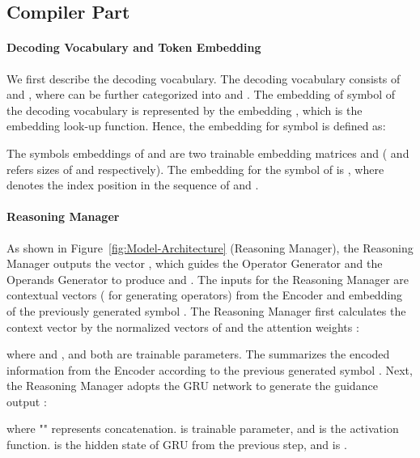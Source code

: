 \documentclass{article}
\begin{document}
\subsection{Compiler Part}

\paragraph{Decoding Vocabulary and Token Embedding}

We first describe the decoding vocabulary. The decoding vocabulary consists of  and , where  can be further categorized into  and . The embedding  of symbol  of the decoding vocabulary is represented by the embedding , which is the embedding look-up function. Hence, the embedding for symbol  is defined as:

\in\in\in

The symbols embeddings of  and  are two trainable embedding matrices  and  ( and  refers sizes of  and   respectively). The embedding for the symbol of  is , where  denotes the index position in the sequence of  and .



\paragraph{Reasoning Manager}

As shown in Figure~\ref{fig:Model-Architecture} (Reasoning Manager), the Reasoning Manager outputs the vector , which guides the Operator Generator and the Operands Generator to produce  and . The inputs for the Reasoning Manager are contextual vectors  (  for generating operators) from the Encoder and embedding of the previously generated symbol . The Reasoning Manager first calculates the context vector  by the normalized vectors of  and the attention weights :












where  and , and both are trainable parameters. The  summarizes the encoded information from the Encoder according to the previous generated symbol . Next, the Reasoning Manager adopts the GRU \cite{GRU} network to generate the guidance output :



where "" represents concatenation.  is trainable parameter, and  is the activation function.  is the hidden state of GRU from the previous step, and  is .
\end{document}
